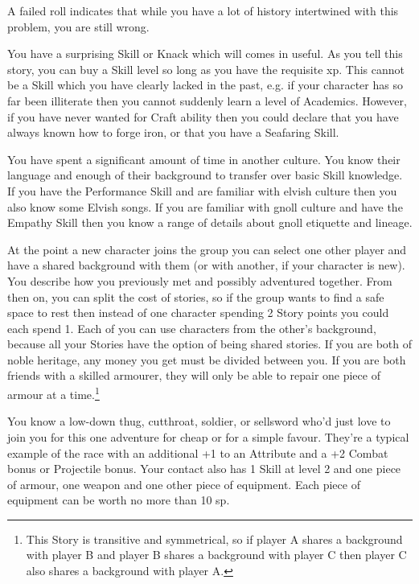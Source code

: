 \begin{multicols}{2}
A failed roll indicates that while you have a lot of history intertwined with this problem, you are still wrong.

You have a surprising Skill or Knack which will comes in useful. As you tell this story, you can buy a Skill level so long as you have the requisite \gls{xp}. This cannot be a Skill which you have clearly lacked in the past, e.g. if your character has so far been illiterate then you cannot suddenly learn a level of Academics. However, if you have never wanted for Craft ability then you could declare that you have always known how to forge iron, or that you have a Seafaring Skill.

You have spent a significant amount of time in another culture. You know their language and enough of their background to transfer over basic Skill knowledge. If you have the Performance Skill and are familiar with elvish culture then you also know some Elvish songs. If you are familiar with gnoll culture and have the Empathy Skill then you know a range of details about gnoll etiquette and lineage.

At the point a new character joins the group you can select one other player and have a shared background with them (or with another, if your character is new). You describe how you previously met and possibly adventured together. From then on, you can split the cost of stories, so if the group wants to find a safe space to rest then instead of one character spending 2 Story points you could each spend 1. Each of you can use characters from the other's background, because all your Stories have the option of being shared stories. If you are both of noble heritage, any money you get must be divided between you. If you are both friends with a skilled armourer, they will only be able to repair one piece of armour at a time.\footnote{This Story is transitive and symmetrical, so if player A shares a background with player B and player B shares a background with player C then player C also shares a background with player A.}

You know a low-down thug, cutthroat, soldier, or sellsword who'd just love to join you for this one adventure for cheap or for a simple favour. They're a typical example of the race with an additional +1 to an Attribute and a +2 Combat bonus or Projectile bonus. Your contact also has 1 Skill at level 2 and one piece of armour, one weapon and one other piece of equipment. Each piece of equipment can be worth no more than 10 \gls{sp}.


\end{multicols}
